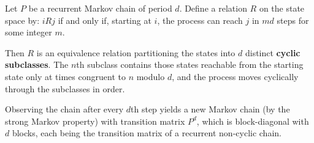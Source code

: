 Let $P$ be a recurrent Markov chain of period $d$. Define a relation $R$ on the state space by: $i R j$ if and only if, starting at $i$, the process can reach $j$ in $md$ steps for some integer $m$.

Then $R$ is an equivalence relation partitioning the states into $d$ distinct \textbf{cyclic subclasses}. The $n$th subclass contains those states reachable from the starting state only at times congruent to $n$ modulo $d$, and the process moves cyclically through the subclasses in order.

Observing the chain after every $d$th step yields a new Markov chain (by the strong Markov property) with transition matrix $P^d$, which is block-diagonal with $d$ blocks, each being the transition matrix of a recurrent non-cyclic chain.
